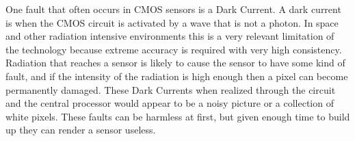 One fault that often occurs in CMOS sensors is a Dark Current.  A dark current is when the CMOS circuit is activated by a wave that is not a photon.  In space and other radiation intensive environments this is a very relevant limitation of the technology because extreme accuracy is required with very high consistency.  Radiation that reaches a sensor is likely to cause the sensor to have some kind of fault, and if the intensity of the radiation is high enough then a pixel can become permanently damaged.  These Dark Currents when realized through the circuit and the central processor would appear to be a noisy picture or a collection of white pixels.  These faults can be harmless at first, but given enough time to build up they can render a sensor useless.